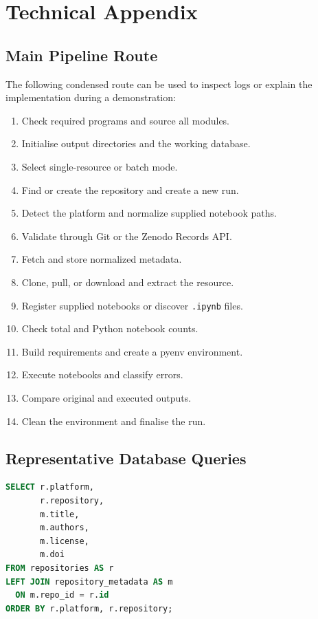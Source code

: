 \chapter{Technical Appendix}

\section{Main Pipeline Route}

The following condensed route can be used to inspect logs or explain the implementation during a demonstration:

\begin{enumerate}
  \item Check required programs and source all modules.
  \item Initialise output directories and the working database.
  \item Select single-resource or batch mode.
  \item Find or create the repository and create a new run.
  \item Detect the platform and normalize supplied notebook paths.
  \item Validate through Git or the Zenodo Records API.
  \item Fetch and store normalized metadata.
  \item Clone, pull, or download and extract the resource.
  \item Register supplied notebooks or discover \texttt{.ipynb} files.
  \item Check total and Python notebook counts.
  \item Build requirements and create a pyenv environment.
  \item Execute notebooks and classify errors.
  \item Compare original and executed outputs.
  \item Clean the environment and finalise the run.
\end{enumerate}

\section{Representative Database Queries}

\begin{lstlisting}[language=SQL,caption={Inspect normalized metadata by platform.}]
SELECT r.platform,
       r.repository,
       m.title,
       m.authors,
       m.license,
       m.doi
FROM repositories AS r
LEFT JOIN repository_metadata AS m
  ON m.repo_id = r.id
ORDER BY r.platform, r.repository;
\end{lstlisting}

